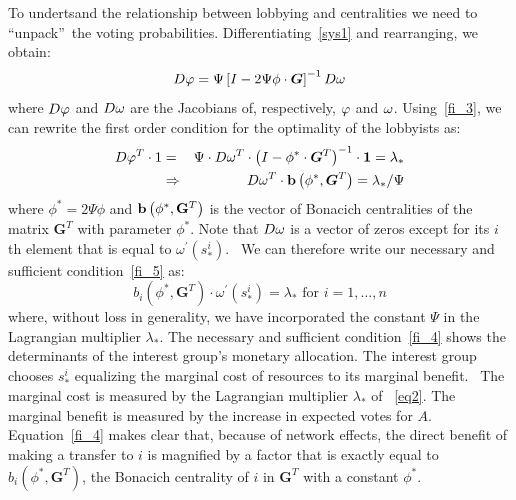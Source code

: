 \documentclass[nojss]{jss}
\begin{document}
To undertsand the relationship between lobbying and centralities we need to
\textquotedblleft unpack\textquotedblright\ the voting probabilities.
Differentiating~\ref{sys1} and rearranging, we obtain:
\begin{equation}
	D{\bf \varphi}=\Psi \left[ I-2\Psi \phi \cdot \boldsymbol{G}\right] ^{-1}D{\bf \omega}
	\label{fi_3}
\end{equation}%
where $D{\bf \varphi}$ and $D{\bf \omega}$ are the Jacobians of,
respectively, ${\bf \varphi }$ and ${\bf \omega}$. Using~\ref{fi_3}, we
can rewrite the first order condition for the optimality of the lobbyists as:%
\begin{eqnarray}
	D{\bf \varphi }^{T}\cdot 1 &=&\Psi \cdot D{\bf \omega }^{T}\cdot \left(
	I-\phi ^{\ast }\cdot \boldsymbol{G}^{T}\right) ^{-1}\cdot {\bf 1}=\lambda _{\ast }
	\label{fi_5} \\
	&\Rightarrow &D{\bf \omega }^{T}\cdot {\bf b}\left( {\bf \phi }^{\ast },\boldsymbol{G}^{T}\right) =\lambda _{\ast }/\Psi   \nonumber
\end{eqnarray}
where $\phi ^{\ast }=2\Psi \phi $ and ${\bf b}\left( {\bf \phi }^{\ast },%
{\bf G}^{T}\right) $ is the vector of Bonacich centralities of the matrix $%
\boldsymbol{G}^{T}$ with parameter $\phi ^{\ast }$. Note that $D{\bf \omega}$ is a
vector of zeros except for its $i$th element that is equal to $\omega
^{\prime}(s_{\ast }^{i})$. \ We can therefore write our necessary and
sufficient condition~\ref{fi_5} as:
\begin{equation}
	b_{i}\left( \phi ^{\ast },\boldsymbol{G}^{T}\right) \cdot \omega ^{\prime }(s_{\ast
	}^{i})=\lambda _{\ast }\text{ for }i=1,\dots,n  \label{fi_4}
\end{equation}%
where, without loss in generality, we have incorporated the constant $\Psi$
in the Lagrangian multiplier $\lambda _{\ast}$. The necessary and
sufficient condition~\ref{fi_4} shows the determinants of the interest
group's monetary allocation. The interest group chooses $s_{\ast}^{i}$
equalizing the marginal cost of resources to its marginal benefit. \ The
marginal cost is measured by the Lagrangian multiplier $\lambda_{\ast}$ of
~\ref{eq2}. The marginal benefit is measured by the increase in expected
votes for $A$. Equation~\ref{fi_4} makes clear that, because of network
effects, the direct benefit of making a transfer to $i$ is magnified by a
factor that is exactly equal to $b_{i}\left(\phi ^{\ast},\boldsymbol{G}^{T}\right) $,
the Bonacich centrality of $i$ in $\boldsymbol{G}^{T}$ with a constant $\phi ^{\ast}$.
\end{document}
